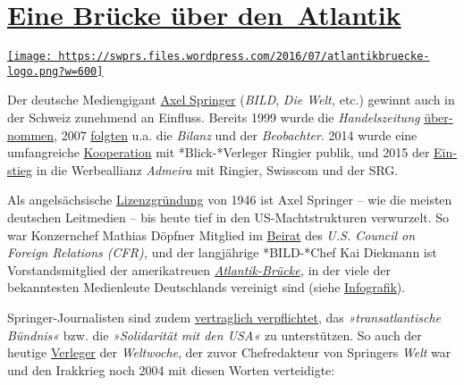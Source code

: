 \hypertarget{eine-bruxfccke-uxfcber-den-atlantik}{%
\section{\texorpdfstring{\href{https://swprs.org/2017/03/01/eine-bruecke-ueber-den-atlantik/}{Eine
Brücke über
den~Atlantik}}{Eine Brücke über den~Atlantik}}\label{eine-bruxfccke-uxfcber-den-atlantik}}

\href{https://swprs.org/2017/03/01/eine-bruecke-ueber-den-atlantik/}{\texttt{[image: https://swprs.files.wordpress.com/2016/07/atlantikbruecke-logo.png?w=600]}}

Der deutsche Medien­gigant
\href{https://de.wikipedia.org/wiki/Axel_Springer_SE}{Axel Springer}
(\emph{BILD}, \emph{Die Welt,} etc.) gewinnt auch in der Schweiz
zu­neh­mend an Einfluss. Bereits 1999 wurde die \emph{Handels­zeitung}
\href{https://de.wikipedia.org/wiki/Handelszeitung}{über­nommen}, 2007
\href{https://de.wikipedia.org/wiki/Jean_Frey_AG}{folgten} u.a. die
\emph{Bilanz} und der \emph{Beobachter}. 2014 wurde eine umfang­reiche
\href{http://www.blick.ch/news/wirtschaft/medien-ringier-und-axel-springer-gruenden-gemeinschaftsunternehmen-in-der-schweiz-id3357037.html}{Koope­ration}
mit *Blick-*Verleger Ringier publik, und 2015 der
\href{http://www.persoenlich.com/marketing/die-werbeallianz-prasentiert-sich-zum-ersten-mal-der-branche}{Ein­stieg}
in die Werbe­allianz \emph{Admeira} mit Ringier, Swiss­com und der SRG.

Als angel­säch­sische
\href{https://de.wikipedia.org/wiki/Lizenzzeitung}{Li­zenz­grün­dung}
von 1946 ist Axel Springer -- wie die meisten deutschen Leit­medien --
bis heute tief in den US-Macht­­struk­turen ver­wur­zelt. So war
Konzern­­chef Mathias Döpfner Mit­glied im
\href{https://www.cfr.org/global-board-advisors}{Bei­rat} des \emph{U.S.
Council on Foreign Relations (CFR),} und der lang­jährige *BILD-*​Chef
Kai Diek­­mann ist Vor­stands­mitglied der ame­ri­ka­treuen
\emph{\href{https://de.wikipedia.org/wiki/Atlantik-Br\%C3\%BCcke}{Atlantik-Brücke},}
in der viele der bekanntesten Medien­leute Deutsch­lands ver­ei­nigt
sind (siehe
\href{https://swprs.org/netzwerk-medien-deutschland/}{Infografik}).

Springer-Journa­listen sind zudem
\href{https://bildblog.de/89290/axel-springer-gibt-sich-neue-alte-grundsaetze/}{ver­­trag­­lich
ver­pfli­ch­tet}, das \emph{»trans­at­lantische Bündnis«} bzw. die
\emph{»Soli­da­rität mit den USA«} zu unter­stützen. So auch der heutige
\href{https://de.wikipedia.org/wiki/Roger_K\%C3\%B6ppel}{Ver­leger} der
\emph{Welt­woche}, der zuvor Chef­re­dakteur von Springers \emph{Welt}
war und den Irak­krieg noch 2004 mit diesen Worten ver­tei­digte:

